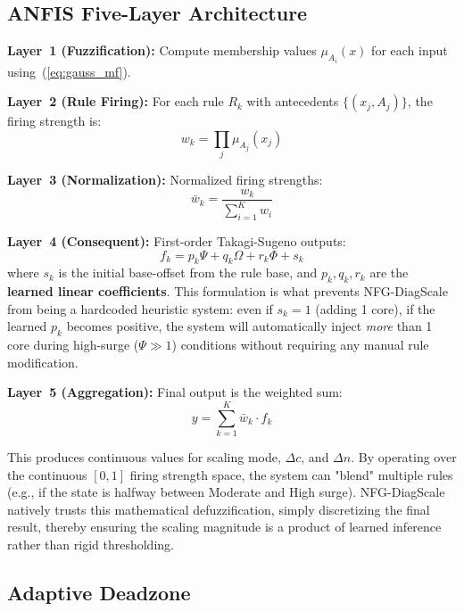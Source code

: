 \documentclass[conference]{IEEEtran}
\begin{document}
\subsection{ANFIS Five-Layer Architecture}

\textbf{Layer~1 (Fuzzification):} Compute membership values $\mu_{A_i}(x)$ for each input using~(\ref{eq:gauss_mf}).

\textbf{Layer~2 (Rule Firing):} For each rule $R_k$ with antecedents $\{(x_j, A_{j})\}$, the firing strength is:
\begin{equation}
w_k = \prod_{j} \mu_{A_j}(x_j)
\end{equation}

\textbf{Layer~3 (Normalization):} Normalized firing strengths:
\begin{equation}
\bar{w}_k = \frac{w_k}{\sum_{i=1}^{K} w_i}
\end{equation}

\textbf{Layer~4 (Consequent):} First-order Takagi-Sugeno outputs:
\begin{equation}
\label{eq:consequent}
f_k = p_k \Psi + q_k \Omega + r_k \Phi + s_k
\end{equation}
\noindent where $s_k$ is the initial base-offset from the rule base, and $p_k, q_k, r_k$ are the \textbf{learned linear coefficients}. This formulation is what prevents NFG-DiagScale from being a hardcoded heuristic system: even if $s_k=1$ (adding 1 core), if the learned $p_k$ becomes positive, the system will automatically inject \emph{more} than 1 core during high-surge ($\Psi \gg 1$) conditions without requiring any manual rule modification.

\textbf{Layer~5 (Aggregation):} Final output is the weighted sum:
\begin{equation}
\label{eq:anfis_output}
y = \sum_{k=1}^{K} \bar{w}_k \cdot f_k
\end{equation}

This produces continuous values for scaling mode, $\Delta c$, and $\Delta n$. By operating over the continuous $[0,1]$ firing strength space, the system can "blend" multiple rules (e.g., if the state is halfway between Moderate and High surge). NFG-DiagScale natively trusts this mathematical defuzzification, simply discretizing the final result, thereby ensuring the scaling magnitude is a product of learned inference rather than rigid thresholding.

\subsection{Adaptive Deadzone}
\end{document}
